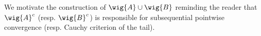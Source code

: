 \documentclass[../../main.tex]{subfiles}
\begin{document}
\begin{remark}[Pointwise + Cauchy = Pointwise: Part 2]
    We motivate the construction of $\wig{A}\cup \wig{B}$ reminding the reader that $\wig{A}^c$ (resp. $\wig{B}^c$) is responsible for subsequential pointwise convergence (resp. Cauchy criterion of the tail).
\end{remark}
\end{document}
